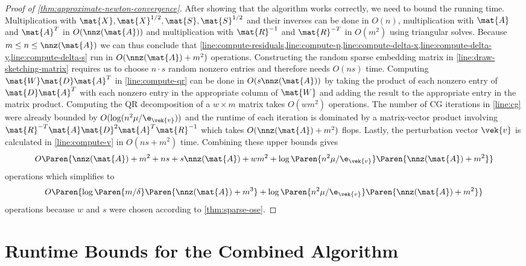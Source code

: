 \begin{proof}[Proof of \cref{thm:approximate-newton-convergence}]
  After showing that the algorithm works correctly, we need to bound the running time.
  Multiplication with \(\mat{X}, \mat{X}^{1/2}, \mat{S}, \mat{S}^{1/2}\) and their inverses can be done in \(O(n)\), multiplication with \(\mat{A}\) and \(\mat{A}^T\) in \(O(\nnz(\mat{A}))\) and multiplication with \(\mat{R}^{-1}\) and \(\mat{R}^{-T}\) in \(O(m^2)\) using triangular solves.
  Because \(m \leq n \leq \nnz(\mat{A})\) we can thus conclude that \cref{line:compute-residuals,line:compute-p,line:compute-delta-x,line:compute-delta-y,line:compute-delta-s} run in \(O(\nnz(\mat{A}) + m^2)\) operations.
  Constructing the random sparse embedding matrix in \cref{line:draw-sketching-matrix} requires us to choose \(n \cdot s\) random nonzero entries and therefore needs \(O(n s)\) time.
  Computing \(\mat{W}\mat{D}\mat{A}^T\) in \cref{line:compute-qr} can be done in \(O(s \nnz(\mat{A}))\) by taking the product of each nonzero entry of \(\mat{D}\mat{A}^T\) with each nonzero entry in the appropriate column of \(\mat{W}\) and adding the result to the appropriate entry in the matrix product.
  Computing the QR decomposition of a \(w \times m\) matrix takes \(O(w m^2)\) operations.
  The number of CG iterations in \cref{line:cg} were already bounded by \(O(\log(n^2 \mu / \e_{\vek{v}}))\) and the runtime of each iteration is dominated by a matrix-vector product involving \(\mat{R}^{-T}\mat{A}\mat{D}^2\mat{A}^T\mat{R}^{-1}\) which takes \(O(\nnz(\mat{A}) + m^2)\) flops.
  Lastly, the perturbation vector \(\vek{v}\) is calculated in \cref{line:compute-v} in \(O(ns + m^2)\) time.
  Combining these upper bounds gives
  \[ O \Paren{\nnz(\mat{A}) + m^2 + ns + s \nnz(\mat{A}) + wm^2 + \log \Paren{n^2 \mu / \e_{\vek{v}}} \Paren{\nnz(\mat{A}) + m^2}} \]
  operations which simplifies to
  \[ O \Paren{\log \Paren{m/\delta} \Paren{\nnz(\mat{A}) + m^3} + \log \Paren{n^2 \mu / \e_{\vek{v}}} \Paren{\nnz(\mat{A}) + m^2}} \]
  operations because \(w\) and \(s\) were chosen according to \cref{thm:sparse-ose}.
\end{proof}


\section{Runtime Bounds for the Combined Algorithm}

